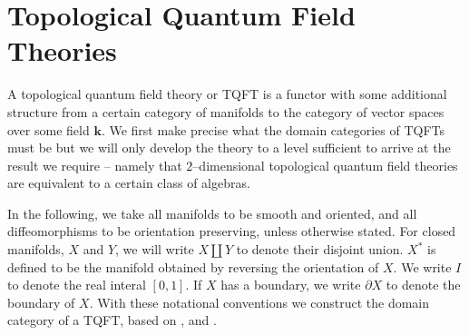 
\pagebreak

\section{Topological Quantum Field Theories}

A topological quantum field theory or TQFT is a functor with some additional
structure from a certain category of manifolds to the category of vector spaces
over some field $\mathbf{k}$. We first make precise what the domain categories
of TQFTs must be but we will only develop the theory to a level sufficient to
arrive at the result we require -- namely that $2$--dimensional topological
quantum field theories are equivalent to a certain class of algebras.

In the following, we take all manifolds to be smooth and oriented, and all
diffeomorphisms to be orientation preserving, unless otherwise stated. For
closed manifolds, $X$ and $Y$, we will write $X \amalg Y$ to denote their
disjoint union. $X^*$ is defined to be the manifold obtained by reversing the
orientation of $X$. We write $I$ to denote the real interal $[0, 1]$. If $X$ has
a boundary, we write $\partial X$ to denote the boundary of $X$. With these
notational conventions we construct the domain category of a TQFT, based on
\cite{Corominas}, \cite{Jorge} and \cite{MayTQFT}.









